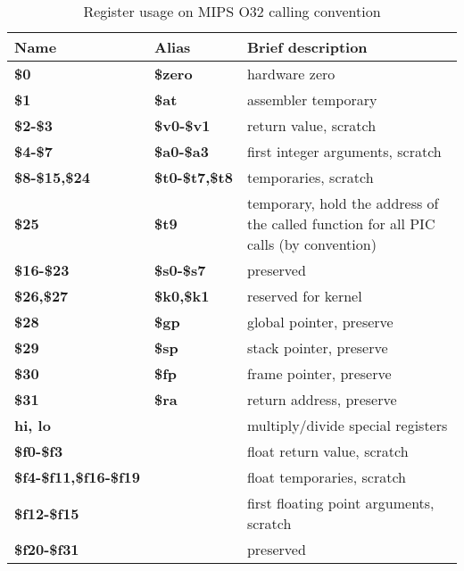 \begin{table}[h]
\begin{tabular*}{0.95\textwidth}{lll}
Name                         & Alias                & Brief description\\
\hline                                                             
{\bf \$0}                    & {\bf \$zero}         & hardware zero \\
{\bf \$1}                    & {\bf \$at}           & assembler temporary \\
{\bf \$2-\$3}                & {\bf \$v0-\$v1}      & return value, scratch \\
{\bf \$4-\$7}                & {\bf \$a0-\$a3}      & first integer arguments, scratch\\
{\bf \$8-\$15,\$24}          & {\bf \$t0-\$t7,\$t8} & temporaries, scratch \\
{\bf \$25}                   & {\bf \$t9}           & temporary, hold the address of the called function for all PIC calls (by convention) \\
{\bf \$16-\$23}              & {\bf \$s0-\$s7}      & preserved \\
{\bf \$26,\$27}              & {\bf \$k0,\$k1}      & reserved for kernel \\
{\bf \$28}                   & {\bf \$gp}           & global pointer, preserve \\
{\bf \$29}                   & {\bf \$sp}           & stack pointer, preserve \\
{\bf \$30}                   & {\bf \$fp}           & frame pointer, preserve \\
{\bf \$31}                   & {\bf \$ra}           & return address, preserve \\
{\bf hi, lo}                 &                      & multiply/divide special registers \\
{\bf \$f0-\$f3}              &                      & float return value, scratch \\
{\bf \$f4-\$f11,\$f16-\$f19} &                      & float temporaries, scratch \\
{\bf \$f12-\$f15}            &                      & first floating point arguments, scratch \\
{\bf \$f20-\$f31}            &                      & preserved \\
\end{tabular*}
\caption{Register usage on MIPS O32 calling convention}
\end{table}

